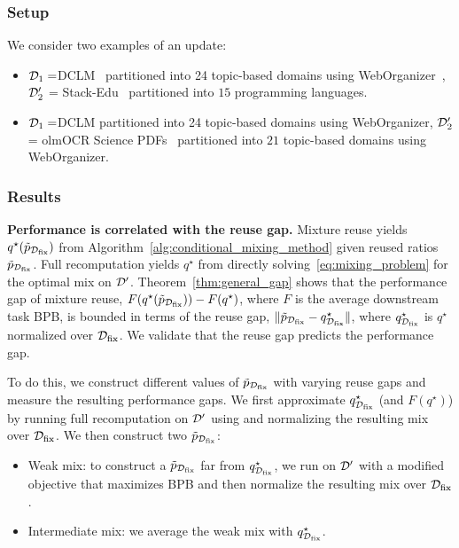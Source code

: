\subsubsection{Setup}

We consider two examples of an \Add update:
\begin{itemize}
    \item $\mathcal{D}_1=$DCLM~\citep{dclm} partitioned into 24 topic-based domains using WebOrganizer~\citep{wettig2025organizewebconstructingdomains}, $\mathcal{D}_2'$ = Stack-Edu~\citep{allal2025smollm2smolgoesbig} partitioned into $15$ programming languages.
    \item $\mathcal{D}_1=$DCLM partitioned into 24 topic-based domains using WebOrganizer, $\mathcal{D}_2'$ = olmOCR Science PDFs~\citep{olmo2025olmo3} partitioned into $21$ topic-based domains using WebOrganizer. 
\end{itemize}

\subsubsection{Results}\label{sec:validation_results}


\textbf{Performance is correlated with the reuse gap.} 
Mixture reuse yields $q^\star(\tilde{p}_{\mathcal{D}_{\text{fix}}})$ from Algorithm~\ref{alg:conditional_mixing_method} given reused ratios $\tilde{p}_{\mathcal{D}_{\text{fix}}}$. Full recomputation yields $q^\star$ from directly solving~\eqref{eq:mixing_problem} for the optimal mix on $\mathcal{D}'$.
Theorem~\ref{thm:general_gap} shows that the performance gap of mixture reuse, $F(q^\star(\tilde{p}_{\mathcal{D}_{\text{fix}}})) - F(q^\star)$, where $F$ is the average downstream task BPB, is bounded in terms of the reuse gap, $\|\tilde{p}_{\mathcal{D}_{\text{fix}}} - q_{\mathcal{D}_{\text{fix}}}^\star \|$, where $q_{\mathcal{D}_{\text{fix}}}^\star$ is $q^\star$ normalized over $\mathcal{D}_{\text{fix}}$. We validate that the reuse gap predicts the performance gap.


To do this, we construct different values of $\tilde{p}_{\mathcal{D}_{\text{fix}}}$ with varying reuse gaps and measure the resulting performance gaps.
We first approximate $q_{\mathcal{D}_{\text{fix}}}^\star$ (and $F(q^\star)$) by running full recomputation on $\mathcal{D}'$ using \base and normalizing the resulting mix over $\mathcal{D}_{\text{fix}}$. 
We then construct two $\tilde{p}_{\mathcal{D}_{\text{fix}}}$:
\begin{itemize}
    \item Weak mix: to construct a $\tilde{p}_{\mathcal{D}_{\text{fix}}}$ far from $q^\star_{\mathcal{D}_{\text{fix}}}$, we run \base on $\mathcal{D}'$ with a modified objective that maximizes BPB and then normalize the resulting mix over $\mathcal{D}_{\text{fix}}$.
    \item Intermediate mix: we average the weak mix with $q^\star_{\mathcal{D}_{\text{fix}}}$.
\end{itemize}

